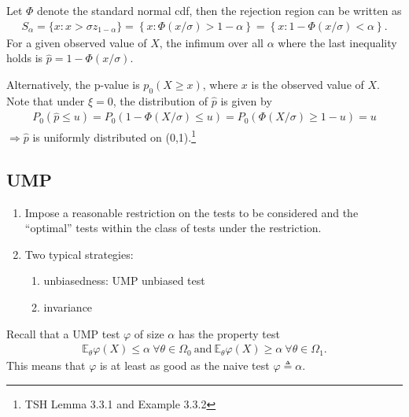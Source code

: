 \begin{example}
    Let $\Phi$ denote the standard normal cdf,
    then the rejection region can be written as 
    \begin{gather}
        S_\alpha
        = \{x:x>\sigma z_{1-\alpha}\}
        = \left\{x: \Phi(x/\sigma)>1-\alpha\right\}
        = \left\{x:1-\Phi(x/\sigma)<\alpha\right\}.
    \end{gather}
    For a given observed value of $X$, 
    the infimum over all $\alpha$ where the last inequality holds is $\hat{p}=1-\Phi(x/\sigma)$.

    Alternatively, the p-value is $p_0(X\geq x)$,
    where $x$ is the observed value of $X$.
    Note that under $\xi=0$, 
    the distribution of $\hat{p}$ is given by
    \begin{gather}
        P_0(\hat{p}\leq u)
        = P_0(1-\Phi(X/\sigma)\leq u)
        = P_0(\Phi(X/\sigma)\geq{1-u})=u
    \end{gather}
    $\Rightarrow\hat{p}$ is uniformly distributed on (0,1).\footnote{
    TSH Lemma 3.3.1 and Example 3.3.2
    }
\end{example}

\subsection{UMP}

\begin{enumerate}
    \item Impose a reasonable restriction on the tests to be considered 
    and the ``optimal'' tests within the class of tests under the restriction.
    \item Two typical strategies:
    \begin{enumerate}
        \item unbiasedness: UMP unbiased test
        \item invariance
    \end{enumerate}
\end{enumerate}

Recall that a UMP test $\varphi$ of size $\alpha$ has the property test 
\begin{gather}
    \mathbb{E}_\theta\varphi(X)\leq\alpha~\forall{\theta}\in\Omega_0
    ~\text{and}~
    \mathbb{E}_\theta\varphi(X)\geq\alpha~\forall{\theta}\in\Omega_1.
    \label{eq:ump}
\end{gather}
This means that $\varphi$ is at least as good as the naive test $\varphi\triangleq\alpha$.

